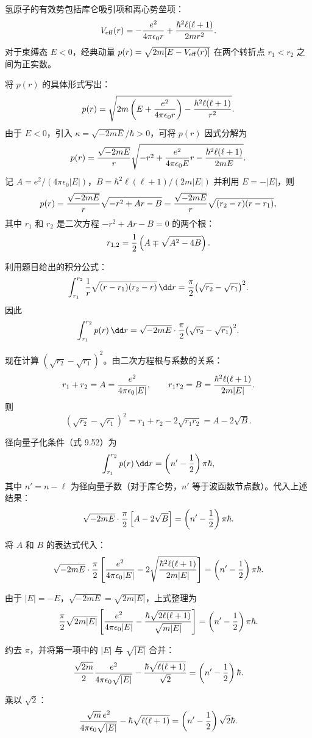 \begin{solution}
氢原子的有效势包括库仑吸引项和离心势垒项：
\[
V_{\rm eff}(r)=-{e^2\over4\pi\epsilon_0 r}+{\hbar^2\ell(\ell+1)\over2mr^2}.
\]
对于束缚态 $E<0$，经典动量 $p(r)=\sqrt{2m[E-V_{\rm eff}(r)]}$ 在两个转折点 $r_1<r_2$ 之间为正实数。

将 $p(r)$ 的具体形式写出：
\[
p(r)=\sqrt{2m\left(E+{e^2\over4\pi\epsilon_0 r}\right)-{\hbar^2\ell(\ell+1)\over r^2}}.
\]
由于 $E<0$，引入 $\kappa=\sqrt{-2mE}/\hbar>0$，可将 $p(r)$ 因式分解为
\[
p(r)={\sqrt{-2mE}\over r}\sqrt{-r^2+{e^2\over4\pi\epsilon_0 E}r
-{\hbar^2\ell(\ell+1)\over2mE}}.
\]
记 $A={e^2/(4\pi\epsilon_0|E|)}$，$B={\hbar^2\ell(\ell+1)/(2m|E|)}$ 并利用 $E=-|E|$，则
\[
p(r)={\sqrt{-2mE}\over r}\sqrt{-r^2+Ar-B}
={\sqrt{-2mE}\over r}\sqrt{(r_2-r)(r-r_1)},
\]
其中 $r_1$ 和 $r_2$ 是二次方程 $-r^2+Ar-B=0$ 的两个根：
\[
r_{1,2}={1\over2}\left(A\mp\sqrt{A^2-4B}\right).
\]

利用题目给出的积分公式：
\[
\int_{r_1}^{r_2}{1\over r}\sqrt{(r-r_1)(r_2-r)}\,\dd r
={\pi\over2}\bigl(\sqrt{r_2}-\sqrt{r_1}\bigr)^2.
\]
因此
\[
\int_{r_1}^{r_2}p(r)\,\dd r
=\sqrt{-2mE}\cdot{\pi\over2}\bigl(\sqrt{r_2}-\sqrt{r_1}\bigr)^2.
\]

现在计算 $(\sqrt{r_2}-\sqrt{r_1})^2$。由二次方程根与系数的关系：
\[
r_1+r_2=A={e^2\over4\pi\epsilon_0|E|},\qquad
r_1r_2=B={\hbar^2\ell(\ell+1)\over2m|E|}.
\]
则
\[
(\sqrt{r_2}-\sqrt{r_1})^2=r_1+r_2-2\sqrt{r_1r_2}
=A-2\sqrt{B}.
\]

径向量子化条件（式 9.52）为
\[
\int_{r_1}^{r_2}p(r)\,\dd r=\left(n'-{1\over2}\right)\pi\hbar,
\]
其中 $n'=n-\ell$ 为径向量子数（对于库仑势，$n'$ 等于波函数节点数）。代入上述结果：
\[
\sqrt{-2mE}\cdot{\pi\over2}\left[A-2\sqrt{B}\right]
=\left(n'-{1\over2}\right)\pi\hbar.
\]

将 $A$ 和 $B$ 的表达式代入：
\[
\sqrt{-2mE}\cdot{\pi\over2}
\left[{e^2\over4\pi\epsilon_0|E|}-2\sqrt{\hbar^2\ell(\ell+1)\over2m|E|}\right]
=\left(n'-{1\over2}\right)\pi\hbar.
\]

由于 $|E|=-E$，$\sqrt{-2mE}=\sqrt{2m|E|}$，上式整理为
\[
{\pi\over2}\sqrt{2m|E|}
\left[{e^2\over4\pi\epsilon_0|E|}-{\hbar\sqrt{2\ell(\ell+1)}\over\sqrt{m|E|}}\right]
=\left(n'-{1\over2}\right)\pi\hbar.
\]

约去 $\pi$，并将第一项中的 $|E|$ 与 $\sqrt{|E|}$ 合并：
\[
{\sqrt{2m}\over2}{e^2\over4\pi\epsilon_0\sqrt{|E|}}
-{\hbar\sqrt{\ell(\ell+1)}\over\sqrt2}
=\left(n'-{1\over2}\right)\hbar.
\]

乘以 $\sqrt2$：
\[
{\sqrt{m}\,e^2\over4\pi\epsilon_0\sqrt{|E|}}
-\hbar\sqrt{\ell(\ell+1)}
=\left(n'-{1\over2}\right)\sqrt2\hbar.
\]


\end{solution}
